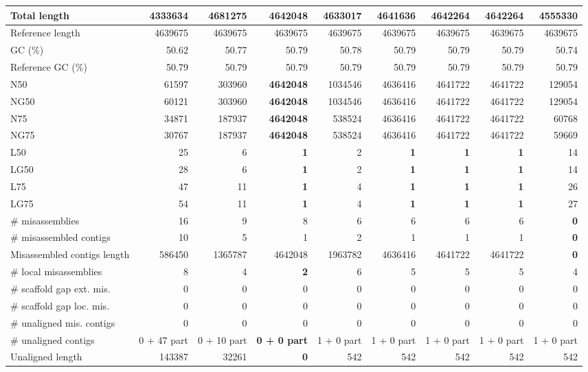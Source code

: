 \documentclass[12pt,a4paper]{article}
\begin{document}
\begin{table}[ht]
\begin{center}
\begin{tabular}{|l*{8}{|r}|}
Total length & 4333634 & {\bf 4681275} & 4642048 & 4633017 & 4641636 & 4642264 & 4642264 & 4555330 \\ \hline
Reference length & 4639675 & 4639675 & 4639675 & 4639675 & 4639675 & 4639675 & 4639675 & 4639675 \\ \hline
GC (\%) & 50.62 & 50.77 & 50.79 & 50.78 & 50.79 & 50.79 & 50.79 & 50.74 \\ \hline
Reference GC (\%) & 50.79 & 50.79 & 50.79 & 50.79 & 50.79 & 50.79 & 50.79 & 50.79 \\ \hline
N50 & 61597 & 303960 & {\bf 4642048} & 1034546 & 4636416 & 4641722 & 4641722 & 129054 \\ \hline
NG50 & 60121 & 303960 & {\bf 4642048} & 1034546 & 4636416 & 4641722 & 4641722 & 129054 \\ \hline
N75 & 34871 & 187937 & {\bf 4642048} & 538524 & 4636416 & 4641722 & 4641722 & 60768 \\ \hline
NG75 & 30767 & 187937 & {\bf 4642048} & 538524 & 4636416 & 4641722 & 4641722 & 59669 \\ \hline
L50 & 25 & 6 & {\bf 1} & 2 & {\bf 1} & {\bf 1} & {\bf 1} & 14 \\ \hline
LG50 & 28 & 6 & {\bf 1} & 2 & {\bf 1} & {\bf 1} & {\bf 1} & 14 \\ \hline
L75 & 47 & 11 & {\bf 1} & 4 & {\bf 1} & {\bf 1} & {\bf 1} & 26 \\ \hline
LG75 & 54 & 11 & {\bf 1} & 4 & {\bf 1} & {\bf 1} & {\bf 1} & 27 \\ \hline
\# misassemblies & 16 & 9 & 8 & 6 & 6 & 6 & 6 & {\bf 0} \\ \hline
\# misassembled contigs & 10 & 5 & 1 & 2 & 1 & 1 & 1 & {\bf 0} \\ \hline
Misassembled contigs length & 586450 & 1365787 & 4642048 & 1963782 & 4636416 & 4641722 & 4641722 & {\bf 0} \\ \hline
\# local misassemblies & 8 & 4 & {\bf 2} & 6 & 5 & 5 & 5 & 4 \\ \hline
\# scaffold gap ext. mis. & 0 & 0 & 0 & 0 & 0 & 0 & 0 & 0 \\ \hline
\# scaffold gap loc. mis. & 0 & 0 & 0 & 0 & 0 & 0 & 0 & 0 \\ \hline
\# unaligned mis. contigs & 0 & 0 & 0 & 0 & 0 & 0 & 0 & 0 \\ \hline
\# unaligned contigs & 0 + 47 part & 0 + 10 part & {\bf 0 + 0 part} & 1 + 0 part & 1 + 0 part & 1 + 0 part & 1 + 0 part & 1 + 0 part \\ \hline
Unaligned length & 143387 & 32261 & {\bf 0} & 542 & 542 & 542 & 542 & 542 \\ \hline

\end{tabular}
\end{center}
\end{table}
\end{document}
